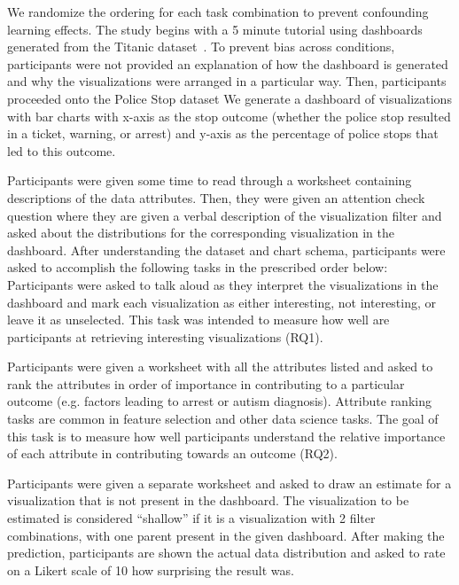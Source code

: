 \par We randomize the ordering for each task combination to prevent confounding learning effects. The study begins with a 5 minute tutorial using dashboards generated from the Titanic dataset~\cite{titanic}. To prevent bias across conditions, participants were not provided an explanation of how the dashboard is generated and why the visualizations were arranged in a particular way. Then, participants proceeded onto the Police Stop dataset%
We generate a dashboard of visualizations with bar charts with x-axis as the stop outcome (whether the police stop resulted in a ticket, warning, or arrest) and y-axis as the percentage of police stops that led to this outcome. 
\par Participants were given some time to read through a worksheet containing descriptions of the data attributes. Then, they were given an attention check question where they are given a verbal description of the visualization filter and asked about the distributions for the corresponding visualization in the dashboard. After understanding the dataset and chart schema, participants were asked to accomplish the following tasks in the prescribed order below:
 Participants were asked to talk aloud as they interpret the visualizations in the dashboard and mark each visualization as either interesting, not interesting, or leave it as unselected. This task was intended to measure how well are participants at retrieving interesting visualizations (RQ1).

 Participants were given a worksheet with all the attributes listed and asked to rank the attributes in order of importance in contributing to a particular outcome (e.g. factors leading to arrest or autism diagnosis). Attribute ranking tasks are common in feature selection and other data science tasks. The goal of this task is to measure how well participants understand the relative importance of each attribute in contributing towards an outcome (RQ2).

 Participants were given a separate worksheet and asked to draw an estimate for a visualization that is not present in the dashboard. The visualization to be estimated is considered ``shallow'' if it is a visualization with 2 filter combinations, with one parent present in the given dashboard. After making the prediction, participants are shown the actual data distribution and asked to rate on a Likert scale of 10 how surprising the result was.

